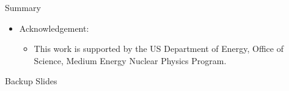 \documentclass[10pt, xcolor={dvipsnames}, aspectratio = 169]{beamer}
\newcommand{\jpsi}{$J/\psi$ }
\begin{document}
\begin{frame}{Summary}
\begin{textblock}{15.0}
\begin{itemize}
\item Acknowledgement:

\begin{itemize}
    \item This work is supported by the US Department of Energy, Office of Science, Medium Energy Nuclear Physics Program.
\end{itemize}

\end{itemize}

\end{textblock}

\end{frame}

%
%
%
%
%

\begin{frame}
\begin{block}
{Backup Slides}
\end{block}
\end{frame}


%
%
\end{document}
